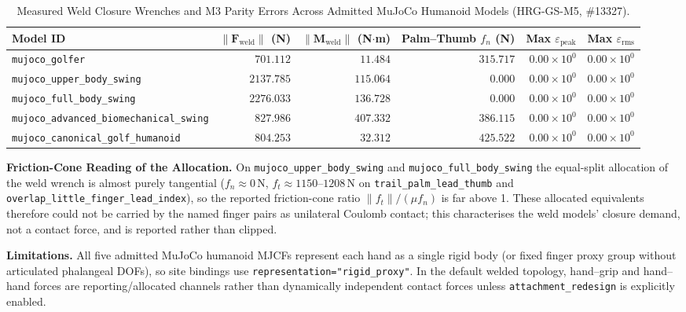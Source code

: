 \documentclass[11pt,a4paper]{article}
\begin{document}
\begin{table}[h!]
\centering
\caption{Measured Weld Closure Wrenches and M3 Parity Errors Across Admitted MuJoCo Humanoid Models (HRG-GS-M5, \#13327).}
\label{tab:hrg-gs-m5-parity}
\small
\begin{tabular}{lrrrrr}
\toprule
Model ID & $\|\mathbf{F}_{\mathrm{weld}}\|$ (N) & $\|\mathbf{M}_{\mathrm{weld}}\|$ (N$\cdot$m) & Palm--Thumb $f_n$ (N) & Max $\varepsilon_{\mathrm{peak}}$ & Max $\varepsilon_{\mathrm{rms}}$ \\
\midrule
\texttt{mujoco\_golfer} & $701.112$ & $11.484$ & $315.717$ & $0.00 \times 10^{0}$ & $0.00 \times 10^{0}$ \\
\texttt{mujoco\_upper\_body\_swing} & $2137.785$ & $115.064$ & $0.000$ & $0.00 \times 10^{0}$ & $0.00 \times 10^{0}$ \\
\texttt{mujoco\_full\_body\_swing} & $2276.033$ & $136.728$ & $0.000$ & $0.00 \times 10^{0}$ & $0.00 \times 10^{0}$ \\
\texttt{mujoco\_advanced\_biomechanical\_swing} & $827.986$ & $407.332$ & $386.115$ & $0.00 \times 10^{0}$ & $0.00 \times 10^{0}$ \\
\texttt{mujoco\_canonical\_golf\_humanoid} & $804.253$ & $32.312$ & $425.522$ & $0.00 \times 10^{0}$ & $0.00 \times 10^{0}$ \\
\bottomrule
\end{tabular}
\end{table}

\textbf{Friction-Cone Reading of the Allocation.} On \texttt{mujoco\_upper\_body\_swing} and \texttt{mujoco\_full\_body\_swing} the equal-split allocation of the weld wrench is almost purely tangential ($f_n \approx 0$\,N, $f_t \approx 1150$--$1208$\,N on \texttt{trail\_palm\_lead\_thumb} and \texttt{overlap\_little\_finger\_lead\_index}), so the reported friction-cone ratio $\|f_t\|/(\mu f_n)$ is far above 1. These allocated equivalents therefore could not be carried by the named finger pairs as unilateral Coulomb contact; this characterises the weld models' closure demand, not a contact force, and is reported rather than clipped.

\textbf{Limitations.}
All five admitted MuJoCo humanoid MJCFs represent each hand as a single rigid body (or fixed finger proxy group without articulated phalangeal DOFs), so site bindings use \texttt{representation="rigid\_proxy"}. In the default welded topology, hand--grip and hand--hand forces are reporting/allocated channels rather than dynamically independent contact forces unless \texttt{attachment\_redesign} is explicitly enabled.
\end{document}
